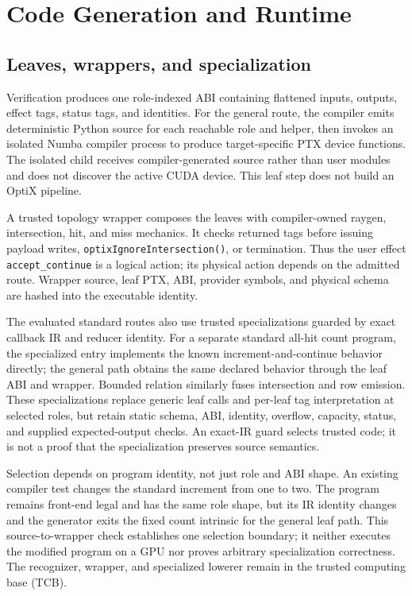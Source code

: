 \documentclass[sigplan,screen,review,anonymous]{acmart}
\begin{document}
\section{Code Generation and Runtime}

\subsection{Leaves, wrappers, and specialization}

Verification produces one role-indexed ABI containing flattened inputs,
outputs, effect tags, status tags, and identities. For the general route, the
compiler emits deterministic Python source for each reachable role and helper,
then invokes an isolated Numba compiler process to produce target-specific PTX
device functions. The isolated child receives compiler-generated source rather
than user modules and does not discover the active CUDA device. This leaf step
does not build an OptiX pipeline.

A trusted topology wrapper composes the leaves with compiler-owned raygen,
intersection, hit, and miss mechanics. It checks returned tags before issuing
payload writes, \texttt{optixIgnoreIntersection()}, or termination. Thus the
user effect \texttt{accept\_continue} is a logical action; its physical action
depends on the admitted route. Wrapper source, leaf PTX, ABI, provider symbols,
and physical schema are hashed into the executable identity.

The evaluated standard routes also use trusted specializations guarded by
exact callback IR and reducer identity. For a separate standard all-hit count
program, the specialized entry implements the known increment-and-continue
behavior directly; the general path obtains the same declared behavior through
the leaf ABI and wrapper. Bounded relation similarly
fuses intersection and row emission. These specializations replace generic
leaf calls and per-leaf tag interpretation at selected roles, but retain static
schema, ABI, identity, overflow, capacity, status, and supplied
expected-output checks. An exact-IR guard selects trusted code; it is not a
proof that the specialization preserves source semantics.

Selection depends on program identity, not just role and ABI shape. An existing
compiler test changes the standard increment from one to two. The program
remains front-end legal and has the same role shape, but its IR identity changes
and the generator exits the fixed count intrinsic for the general leaf path.
This source-to-wrapper check establishes one selection boundary; it neither
executes the modified program on a GPU nor proves arbitrary specialization
correctness. The recognizer, wrapper, and specialized lowerer remain in the
trusted computing base (TCB).
\end{document}
